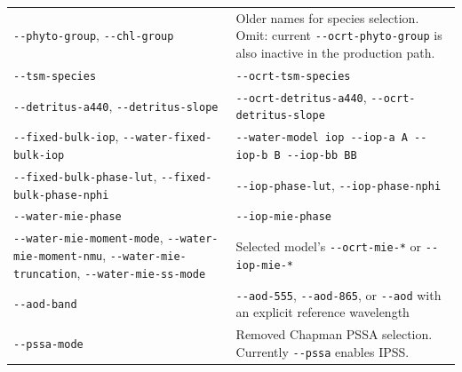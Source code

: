 {\begin{longtable}{@{}>{\raggedright\arraybackslash}p{}>{\raggedright\arraybackslash}p{}@{}}
\texttt{-\allowbreak{}-\allowbreak{}phyto-\allowbreak{}group}, \texttt{-\allowbreak{}-\allowbreak{}chl-\allowbreak{}group} & Older names for species selection. Omit: current \texttt{-\allowbreak{}-\allowbreak{}ocrt-\allowbreak{}phyto-\allowbreak{}group} is also inactive in the production path. \\
\texttt{-\allowbreak{}-\allowbreak{}tsm-\allowbreak{}species} & \texttt{-\allowbreak{}-\allowbreak{}ocrt-\allowbreak{}tsm-\allowbreak{}species} \\
\texttt{-\allowbreak{}-\allowbreak{}detritus-\allowbreak{}a440}, \texttt{-\allowbreak{}-\allowbreak{}detritus-\allowbreak{}slope} & \texttt{-\allowbreak{}-\allowbreak{}ocrt-\allowbreak{}detritus-\allowbreak{}a440}, \texttt{-\allowbreak{}-\allowbreak{}ocrt-\allowbreak{}detritus-\allowbreak{}slope} \\
\texttt{-\allowbreak{}-\allowbreak{}fixed-\allowbreak{}bulk-\allowbreak{}iop}, \texttt{-\allowbreak{}-\allowbreak{}water-\allowbreak{}fixed-\allowbreak{}bulk-\allowbreak{}iop} & \texttt{-\allowbreak{}-\allowbreak{}water-\allowbreak{}model iop -\allowbreak{}-\allowbreak{}iop-\allowbreak{}a A -\allowbreak{}-\allowbreak{}iop-\allowbreak{}b B -\allowbreak{}-\allowbreak{}iop-\allowbreak{}bb BB} \\
\texttt{-\allowbreak{}-\allowbreak{}fixed-\allowbreak{}bulk-\allowbreak{}phase-\allowbreak{}lut}, \texttt{-\allowbreak{}-\allowbreak{}fixed-\allowbreak{}bulk-\allowbreak{}phase-\allowbreak{}nphi} & \texttt{-\allowbreak{}-\allowbreak{}iop-\allowbreak{}phase-\allowbreak{}lut}, \texttt{-\allowbreak{}-\allowbreak{}iop-\allowbreak{}phase-\allowbreak{}nphi} \\
\texttt{-\allowbreak{}-\allowbreak{}water-\allowbreak{}mie-\allowbreak{}phase} & \texttt{-\allowbreak{}-\allowbreak{}iop-\allowbreak{}mie-\allowbreak{}phase} \\
\texttt{-\allowbreak{}-\allowbreak{}water-\allowbreak{}mie-\allowbreak{}moment-\allowbreak{}mode}, \texttt{-\allowbreak{}-\allowbreak{}water-\allowbreak{}mie-\allowbreak{}moment-\allowbreak{}nmu}, \texttt{-\allowbreak{}-\allowbreak{}water-\allowbreak{}mie-\allowbreak{}truncation}, \texttt{-\allowbreak{}-\allowbreak{}water-\allowbreak{}mie-\allowbreak{}ss-\allowbreak{}mode} & Selected model's \texttt{-\allowbreak{}-\allowbreak{}ocrt-\allowbreak{}mie-\allowbreak{}*} or \texttt{-\allowbreak{}-\allowbreak{}iop-\allowbreak{}mie-\allowbreak{}*} \\
\texttt{-\allowbreak{}-\allowbreak{}aod-\allowbreak{}band} & \texttt{-\allowbreak{}-\allowbreak{}aod-\allowbreak{}555}, \texttt{-\allowbreak{}-\allowbreak{}aod-\allowbreak{}865}, or \texttt{-\allowbreak{}-\allowbreak{}aod} with an explicit reference wavelength \\
\texttt{-\allowbreak{}-\allowbreak{}pssa-\allowbreak{}mode} & Removed Chapman PSSA selection. Currently \texttt{-\allowbreak{}-\allowbreak{}pssa} enables IPSS. \\
\end{longtable}
}

